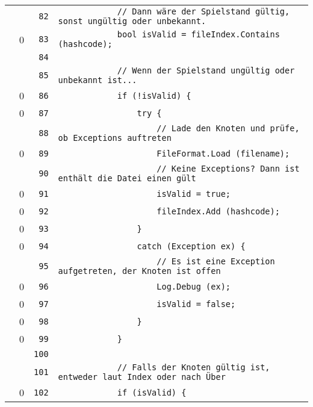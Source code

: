 \documentclass[a4paper,10pt]{article}
\begin{document}
\begin{longtable}[l]{lrrl}
\cellcolor{gray} &  & \verb~82~ & \verb~            // Dann wäre der Spielstand gültig, sonst ungültig oder unbekannt.~\\
\cellcolor{red} & 0 & \verb~83~ & \verb~            bool isValid = fileIndex.Contains (hashcode);~\\
\cellcolor{gray} &  & \verb~84~ & \verb~~\\
\cellcolor{gray} &  & \verb~85~ & \verb~            // Wenn der Spielstand ungültig oder unbekannt ist...~\\
\cellcolor{red} & 0 & \verb~86~ & \verb~            if (!isValid) {~\\
\cellcolor{red} & 0 & \verb~87~ & \verb~                try {~\\
\cellcolor{gray} &  & \verb~88~ & \verb~                    // Lade den Knoten und prüfe, ob Exceptions auftreten~\\
\cellcolor{red} & 0 & \verb~89~ & \verb~                    FileFormat.Load (filename);~\\
\cellcolor{gray} &  & \verb~90~ & \verb~                    // Keine Exceptions? Dann ist enthält die Datei einen gült~\\
\cellcolor{red} & 0 & \verb~91~ & \verb~                    isValid = true;~\\
\cellcolor{red} & 0 & \verb~92~ & \verb~                    fileIndex.Add (hashcode);~\\
\cellcolor{red} & 0 & \verb~93~ & \verb~                }~\\
\cellcolor{red} & 0 & \verb~94~ & \verb~                catch (Exception ex) {~\\
\cellcolor{gray} &  & \verb~95~ & \verb~                    // Es ist eine Exception aufgetreten, der Knoten ist offen~\\
\cellcolor{red} & 0 & \verb~96~ & \verb~                    Log.Debug (ex);~\\
\cellcolor{red} & 0 & \verb~97~ & \verb~                    isValid = false;~\\
\cellcolor{red} & 0 & \verb~98~ & \verb~                }~\\
\cellcolor{red} & 0 & \verb~99~ & \verb~            }~\\
\cellcolor{gray} &  & \verb~100~ & \verb~~\\
\cellcolor{gray} &  & \verb~101~ & \verb~            // Falls der Knoten gültig ist, entweder laut Index oder nach Über~\\
\cellcolor{red} & 0 & \verb~102~ & \verb~            if (isValid) {~\\

\end{longtable}
\end{document}
